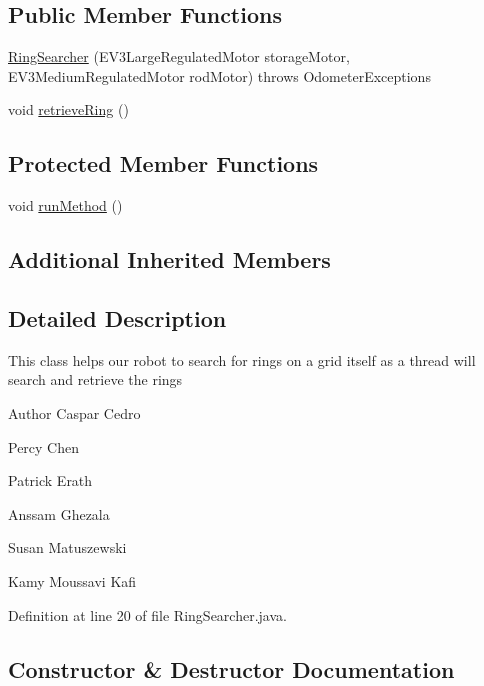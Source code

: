 \subsection*{Public Member Functions}
\begin{DoxyCompactItemize}
\item 
\hyperlink{classca_1_1mcgill_1_1ecse211_1_1threads_1_1_ring_searcher_a58fdaba16c2b961446d1474b76e66e49}{Ring\+Searcher} (E\+V3\+Large\+Regulated\+Motor storage\+Motor, E\+V3\+Medium\+Regulated\+Motor rod\+Motor)  throws Odometer\+Exceptions 
\item 
void \hyperlink{classca_1_1mcgill_1_1ecse211_1_1threads_1_1_ring_searcher_abd7a2651a7c5de76a018664c8bf327af}{retrieve\+Ring} ()
\end{DoxyCompactItemize}
\subsection*{Protected Member Functions}
\begin{DoxyCompactItemize}
\item 
void \hyperlink{classca_1_1mcgill_1_1ecse211_1_1threads_1_1_ring_searcher_a2b03c700b5d232f5aef7c6acf439b7ea}{run\+Method} ()
\end{DoxyCompactItemize}
\subsection*{Additional Inherited Members}


\subsection{Detailed Description}
This class helps our robot to search for rings on a grid itself as a thread will search and retrieve the rings

\begin{DoxyAuthor}{Author}
Caspar Cedro 

Percy Chen 

Patrick Erath 

Anssam Ghezala 

Susan Matuszewski 

Kamy Moussavi Kafi 
\end{DoxyAuthor}


Definition at line 20 of file Ring\+Searcher.\+java.



\subsection{Constructor \& Destructor Documentation}
\mbox{\label{classca_1_1mcgill_1_1ecse211_1_1threads_1_1_ring_searcher_a58fdaba16c2b961446d1474b76e66e49}} 
